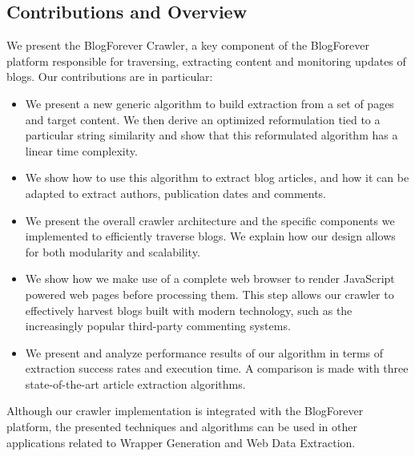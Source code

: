 \subsection{Contributions and Overview}
We present the BlogForever Crawler, a key component of the BlogForever platform responsible for traversing, extracting content and monitoring updates of blogs.
Our contributions are in particular:

\begin{itemize}
  \item We present a new generic algorithm to build extraction from a set of pages and target content. We then derive an optimized reformulation tied to a particular string similarity and show that this reformulated algorithm has a linear time complexity.
  \item We show how to use this algorithm to extract blog articles, and how it can be adapted to extract authors, publication dates and comments.
  \item We present the overall crawler architecture and the specific components we implemented to efficiently traverse blogs. We explain how our design allows for both modularity and scalability.
  \item We show how we make use of a complete web browser to render JavaScript powered web pages before processing them. This step allows our crawler to effectively harvest blogs built with modern technology, such as the increasingly popular third-party commenting systems.
  \item We present and analyze performance results of our algorithm in terms of extraction success rates and execution time. A comparison is made with three state-of-the-art article extraction algorithms.
\end{itemize}

Although our crawler implementation is integrated with the BlogForever platform, the presented techniques and algorithms can be used in other applications related to Wrapper Generation and Web Data Extraction.
